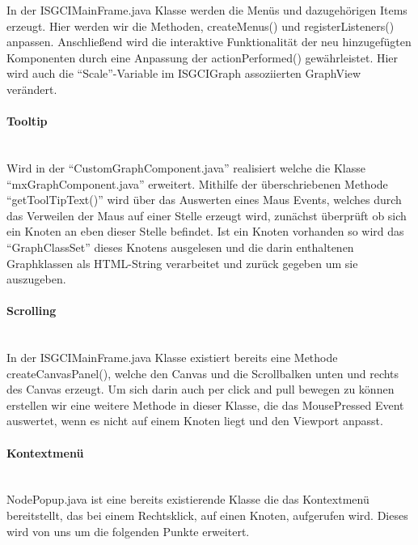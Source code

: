 \documentclass[10pt,a4paper]{article}
\begin{document}
In der ISGCIMainFrame.java Klasse werden die Menüs und dazugehörigen Items erzeugt. Hier werden wir die Methoden, createMenus() und registerListeners() anpassen. Anschließend wird die interaktive Funktionalität der neu hinzugefügten Komponenten durch eine Anpassung der actionPerformed() gewährleistet. Hier wird auch die "`Scale"'-Variable im ISGCIGraph assoziierten GraphView verändert.

\paragraph{Tooltip}\ \\ 

Wird in der "`CustomGraphComponent.java"' realisiert welche die Klasse "`mxGraphComponent.java"' erweitert. Mithilfe der überschriebenen Methode "`getToolTipText()"' wird über das Auswerten eines Maus Events, welches durch das Verweilen der Maus auf einer Stelle erzeugt wird, zunächst überprüft ob sich ein Knoten an eben dieser Stelle befindet. Ist ein Knoten vorhanden so wird das "`GraphClassSet"' dieses Knotens ausgelesen und die darin enthaltenen Graphklassen als HTML-String verarbeitet und zurück gegeben um sie auszugeben. 

\paragraph{Scrolling}\ \\ 
In der ISGCIMainFrame.java Klasse existiert bereits eine Methode createCanvasPanel(), welche den Canvas und die Scrollbalken unten und rechts des Canvas erzeugt. Um sich darin auch per click and pull bewegen zu können erstellen wir eine weitere Methode in dieser Klasse, die das MousePressed Event auswertet, wenn es nicht auf einem Knoten liegt und den Viewport anpasst.

\paragraph{Kontextmenü}\ \\ 
NodePopup.java ist eine bereits existierende Klasse die das Kontextmenü bereitstellt, das bei einem Rechtsklick, auf einen Knoten, aufgerufen wird. Dieses wird von uns um die folgenden Punkte erweitert. 
\end{document}
